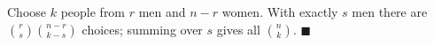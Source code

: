 Choose $k$ people from $r$ men and $n-r$ women. With exactly $s$ men there are $\binom rs\binom{n-r}{k-s}$ choices; summing over $s$ gives all $\binom nk$. $\blacksquare$

